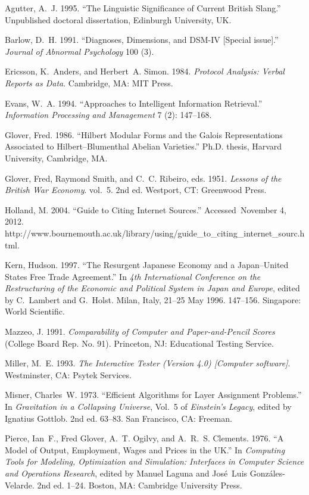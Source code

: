 \documentclass{tBPS2e}
\theoremstyle{plain}
\theoremstyle{definition}
\theoremstyle{remark}
\begin{document}
\begin{thebibliography}{99}

Agutter, A.~J. 1995. ``The Linguistic Significance of Current {B}ritish
 Slang.'' Unpublished doctoral dissertation, Edinburgh University, UK.

Barlow, D.~H. 1991. ``Diagnoses, Dimensions, and {DSM-IV} [Special issue].''
 \emph{Journal of Abnormal Psychology} 100 (3).

Ericsson, K.~Anders, and Herbert~A. Simon. 1984. \emph{Protocol Analysis:
 Verbal Reports as Data}. Cambridge, MA: MIT Press.

Evans, W.~A. 1994. ``Approaches to Intelligent Information Retrieval.''
 \emph{Information Processing and Management} 7 (2): 147--168.

Glover, Fred. 1986. ``Hilbert Modular Forms and the {G}alois Representations
 Associated to {H}ilbert--{B}lumenthal Abelian Varieties.'' Ph.D. thesis,
 Harvard University, Cambridge, MA.

Glover, Fred, Raymond Smith, and C.~C. Ribeiro, eds. 1951. \emph{Lessons of the {B}ritish War
 Economy}. vol.~5. 2nd ed. Westport, CT: Greenwood Press.

Holland, M. 2004. ``Guide to Citing Internet Sources.'' Accessed~November 4,
 2012.
 http://www.bournemouth.ac.uk/library/using/guide\_to\_citing\_internet\_sourc.html.

Kern, Hudson. 1997. ``The Resurgent {J}apanese Economy and a {J}apan--{U}nited
 {S}tates Free Trade Agreement.'' In \emph{4th International Conference on the
 Restructuring of the Economic and Political System in {J}apan and {E}urope},
 edited by C.~Lambert and G.~Holst. Milan, Italy, 21--25 May 1996. 147--156.
 Singapore: World Scientific.

Mazzeo, J. 1991. \emph{Comparability of Computer and Paper-and-Pencil Scores}
 (College Board Rep. No. 91). Princeton, NJ: Educational Testing Service.

Miller, M.~E. 1993. \emph{The Interactive Tester (Version 4.0) [Computer
 software]}. Westminster, CA: Psytek Services.

Misner, Charles~W. 1973. ``Efficient Algorithms for Layer Assignment
 Problems.'' In \emph{Gravitation in a Collapsing {U}niverse}, Vol.~5 of
 \emph{Einstein's Legacy}, edited by Ignatius Gottlob. 2nd ed. 63--83. San
 Francisco, CA: Freeman.

Pierce, Ian~F., Fred Glover, A.~T. Ogilvy, and A.~R.~S. Clements. 1976.
 ``A Model of Output, Employment, Wages and Prices in the {UK}.'' In
 \emph{Computing Tools for Modeling, Optimization and Simulation: Interfaces
 in Computer Science and Operations Research}, edited by Manuel Laguna and
 Jos\'{e}~Luis Gonz\'{a}les-Velarde. 2nd ed. 1--24. Boston, MA:
 Cambridge University Press.

\end{thebibliography}
\end{document}
